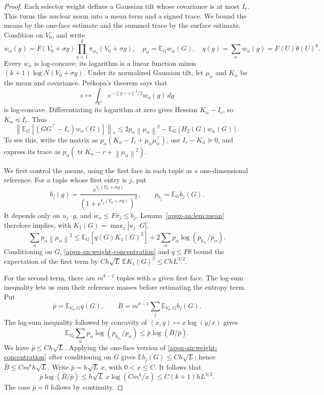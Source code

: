 \documentclass[11pt,letterpaper]{article}
\theoremstyle{remark}
\newcommand{\E}{\mathbb E}
\newcommand{\R}{\mathbb R}
\newcommand{\tr}{\operatorname{tr}}
\newcommand{\norm}[1]{\left\lVert#1\right\rVert}
\newcommand{\dd}{\,d}
\newcommand{\Hh}{H_2}
\begin{document}
\begin{proof}
Each selector weight defines a Gaussian tilt whose covariance is at
most \(I_r\). This turns the nuclear norm into a mean term and a signed
trace. We bound the means by the one-face estimate and the summed trace
by the surface estimate. Condition on \(V_0\), and write
\[
 w_\alpha(g)=F(V_0+\sigma g)
                  \prod_{a=1}^k\pi_{\alpha_a}(V_0+\sigma g),
 \quad p_\alpha=\E_Gw_\alpha(G),
 \quad q(g)=\sum_\alpha w_\alpha(g)=F(U)\theta(U)^k.
\]
Every \(w_\alpha\) is log-concave: its logarithm is a linear
function minus \((k+1)\log N(V_0+\sigma g)\).  Under its normalized
Gaussian tilt, let \(\mu_\alpha\) and \(K_\alpha\) be the mean and
covariance.  Pr\'ekopa's theorem says that
\[
 z\longmapsto\int_{\R^r}e^{-\norm{g-z}^2/2}w_\alpha(g)\dd g
\]
is log-concave.  Differentiating its logarithm at zero gives Hessian
\(K_\alpha-I_r\), so \(K_\alpha\preceq I_r\).  Thus
\begin{equation}
 \left\|\E_G[(GG^\top-I_r)w_\alpha(G)]\right\|_*
 \le2p_\alpha\norm{\mu_\alpha}^2
             -\E_G[\Hh(G)w_\alpha(G)].
 \label{appx-an:matrix-trace-reduction}
\end{equation}
To see this, write the matrix as
\(p_\alpha(K_\alpha-I_r+\mu_\alpha\mu_\alpha^\top)\), use
\(I_r-K_\alpha\succeq0\), and express its trace as
\(p_\alpha(\tr K_\alpha-r+\norm{\mu_\alpha}^2)\).

We first control the means, using the first face in each tuple as a
one-dimensional reference. For a tuple whose first entry is \(j\), put
\[
 b_j(g)=\frac{e^{t_j(V_0+\sigma g)}}
                   {(1+e^{t_j(V_0+\sigma g)})^2},
 \qquad p_{b_j}=\E_Gb_j(G).
\]
It depends only on \(u_j\cdot g\), and
\(w_\alpha\le F\pi_j\le b_j\).  Lemma~\ref{appx-an:lem:mean} therefore
implies, with \(K_1(G)=\max_j|u_j\cdot G|\),
\begin{equation}
 \sum_\alpha p_\alpha\norm{\mu_\alpha}^2
 \le\E_G[q(G)K_1(G)^2]
       +2\sum_\alpha p_\alpha\log(p_{b_{\alpha_1}}/p_\alpha).
 \label{appx-an:entropy-sum}
\end{equation}
Conditioning on \(G\), \eqref{appx-an:weight-concentration} and
\(q\le F\theta\) bound the expectation of the first term by
\(Ch\sqrt L\,\E K_1(G)^2\le ChL^{3/2}\).

For the second term, there are \(m^{k-1}\) tuples with a given first
face. The log-sum inequality lets us sum their reference masses before
estimating the entropy term. Put
\[
 \bar p=\E_{V_0,G}q(G),\qquad
 \bar B=m^{k-1}\sum_j\E_{V_0,G}b_j(G).
\]
The log-sum inequality followed by concavity of
\((x,y)\mapsto x\log(y/x)\) gives
\[
 \E_{V_0}\sum_\alpha p_\alpha
          \log(p_{b_{\alpha_1}}/p_\alpha)
 \le\bar p\log(\bar B/\bar p).
\]
We have \(\bar p\le Ch\sqrt L\).  Applying the one-face version of
\eqref{appx-an:weight-concentration} after conditioning on \(G\) gives
\(\E b_j(G)\le Ch\sqrt L\); hence
\(\bar B\le Cm^kh\sqrt L\).  Write \(\bar p=h\sqrt L\,x\),
with \(0<x\le C\).  It follows that
\[
 \bar p\log(\bar B/\bar p)
 \le h\sqrt L\,x\log(Cm^k/x)
 \le C(k+1)hL^{3/2}.
\]
The case \(\bar p=0\) follows by continuity.


\end{proof}
\end{document}

